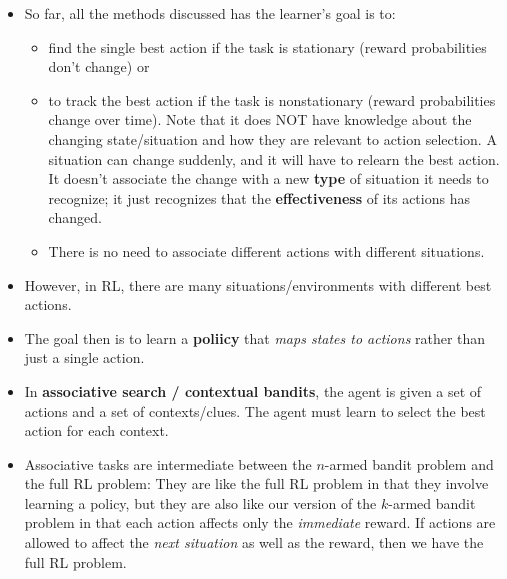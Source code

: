 \begin{itemize}
\item So far, all the methods discussed has the learner's goal is to:
\subitem 
\begin{itemize}
    \item find the single best action if the task is stationary (reward probabilities don't change) or 
    \item to track the best action if the task is nonstationary (reward probabilities change over time). Note that it does NOT have knowledge about the changing state/situation and how they are relevant to action selection. 
    A situation can change suddenly, and it will have to relearn the best action. It doesn't associate the change with a new \textbf{type} of situation it needs to recognize; it just recognizes that the \textbf{effectiveness} of its actions has changed.
    \item There is no need to associate different actions with different situations.
\end{itemize}
\item However, in RL, there are many situations/environments with different best actions. 
\item The goal then is to learn a \textbf{poliicy} that \textit{maps states to actions} rather than just a single action.
\item In \textbf{associative search / contextual bandits}, the agent is given a set of actions and a set of contexts/clues. The agent must learn to select the best action for each context.
\item Associative tasks are intermediate between the \(n\)-armed bandit problem and the full RL problem:  They are like
the full RL problem in that they involve learning a policy, but they are also like our version of the \(k\)-armed bandit problem in that each action affects only the \textit{immediate} reward. 
If actions are allowed to affect the \textit{next situation} as well as the reward, then we have the full RL problem.
\end{itemize}



